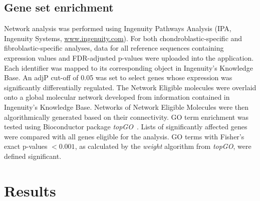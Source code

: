 \subsection{Gene set enrichment}
Network analysis was performed using Ingenuity Pathways
Analysis (IPA, Ingenuity Systems, \url{www.ingenuity.com}). For both chondroblastic\hyp{}specific and
fibroblastic\hyp{}specific analyses, data for all reference
sequences containing expression values and FDR\hyp{}adjusted
p-values were uploaded into the application.
Each identifier was mapped to its corresponding object
in Ingenuity's Knowledge Base. An adjP cut-off of 0.05
was set to select genes whose expression was significantly
differentially regulated. The Network Eligible
molecules were overlaid onto a global molecular network
developed from information contained in Ingenuity's
Knowledge Base. Networks of Network Eligible
Molecules were then algorithmically generated based on
their connectivity. GO term enrichment was tested
using Bioconductor package {\it topGO}~\cite{alexa2006improved}. Lists of significantly
affected genes were compared with all genes eligible
for the analysis. GO terms with Fisher's exact p-values
$< 0.001$, as calculated by the {\it weight} algorithm
from {\it topGO}, were defined significant.

\section{Results}\label{results3}
